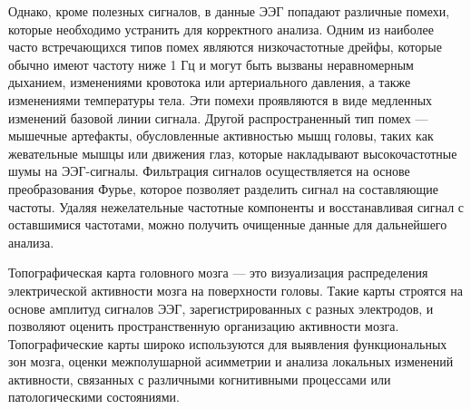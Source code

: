 Однако, кроме полезных сигналов, в данные ЭЭГ попадают различные помехи, которые необходимо устранить для корректного анализа. Одним из наиболее часто встречающихся типов помех являются низкочастотные дрейфы, которые обычно имеют частоту ниже 1 Гц и могут быть вызваны неравномерным дыханием, изменениями кровотока или артериального давления, а также изменениями температуры тела. Эти помехи проявляются в виде медленных изменений базовой линии сигнала. Другой распространенный тип помех — мышечные артефакты, обусловленные активностью мышц головы, таких как жевательные мышцы или движения глаз, которые накладывают высокочастотные шумы на ЭЭГ-сигналы. Фильтрация сигналов осуществляется на основе преобразования Фурье, которое позволяет разделить сигнал на составляющие частоты. Удаляя нежелательные частотные компоненты и восстанавливая сигнал с оставшимися частотами, можно получить очищенные данные для дальнейшего анализа.

Топографическая карта головного мозга — это визуализация распределения электрической активности мозга на поверхности головы. Такие карты строятся на основе амплитуд сигналов ЭЭГ, зарегистрированных с разных электродов, и позволяют оценить пространственную организацию активности мозга. Топографические карты широко используются для выявления функциональных зон мозга, оценки межполушарной асимметрии и анализа локальных изменений активности, связанных с различными когнитивными процессами или патологическими состояниями.


\endinput